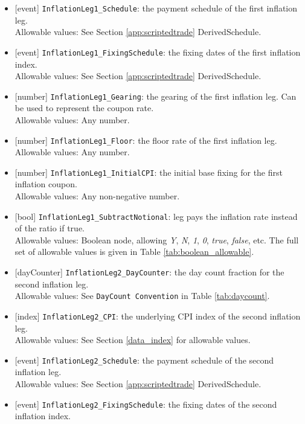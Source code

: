\begin{itemize}
  \item{}[event] \lstinline!InflationLeg1_Schedule!: the payment schedule of the first inflation leg. \\
  Allowable values: See Section \ref{app:scriptedtrade} DerivedSchedule.
  \item{}[event] \lstinline!InflationLeg1_FixingSchedule!: the fixing dates of the first inflation index. \\
  Allowable values: See Section \ref{app:scriptedtrade} DerivedSchedule.
  \item{}[number] \lstinline!InflationLeg1_Gearing!:  the gearing of the first inflation leg. Can be used to represent the coupon rate. \\
  Allowable values: Any number.
  \item{}[number] \lstinline!InflationLeg1_Floor!:  the floor rate of the first inflation leg. \\
  Allowable values: Any  number.
  \item{}[number] \lstinline!InflationLeg1_InitialCPI!: the initial base fixing for the first inflation coupon. \\
  Allowable values: Any non-negative number.
  \item{}[bool] \lstinline!InflationLeg1_SubtractNotional!: leg pays the inflation rate instead of the ratio if true. \\
  Allowable values: Boolean node, allowing \emph{Y}, \emph{N}, \emph{1}, \emph{0}, \emph{true}, \emph{false}, etc. The
  full set of allowable values is given in Table \ref{tab:boolean_allowable}.
  \item{}[dayCounter] \lstinline!InflationLeg2_DayCounter!: the day count fraction for the second inflation leg. \\
  Allowable values: See \lstinline!DayCount Convention! in Table \ref{tab:daycount}.
  \item{}[index] \lstinline!InflationLeg2_CPI!:  the underlying CPI index of the second inflation leg. \\
  Allowable values: See Section \ref{data_index} for allowable values.
  \item{}[event] \lstinline!InflationLeg2_Schedule!: the payment schedule of the second inflation leg. \\
  Allowable values: See Section \ref{app:scriptedtrade} DerivedSchedule.
  \item{}[event] \lstinline!InflationLeg2_FixingSchedule!: the fixing dates of the second inflation index. \\

\end{itemize}
